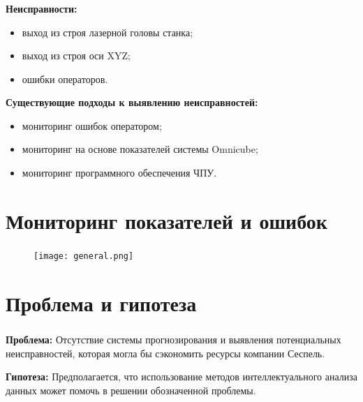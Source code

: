 \begin{frame}
\frametitle{\insertsection}

\textbf{Неисправности:}
\begin{itemize}
    \item выход из строя лазерной головы станка;
    \item выход из строя оси XYZ;
    \item ошибки операторов.
\end{itemize}

\textbf{Существующие подходы к выявлению неисправностей:}
\begin{itemize}
    \item мониторинг ошибок оператором;
    \item мониторинг на основе показателей системы Omnicube;
    \item мониторинг программного обеспечения ЧПУ.
\end{itemize}


\end{frame}


\section{Мониторинг показателей и ошибок}

\begin{frame}
\frametitle{\insertsection}

\begin{figure}
    \center
    \texttt{[image: general.png]}
\end{figure}


\end{frame}


\section{Проблема и гипотеза}

\begin{frame}
    \frametitle{\insertsection}

\textbf{Проблема:}
Отсутствие системы прогнозирования и выявления потенциальных неисправностей,
которая могла бы сэкономить ресурсы компании Сеспель.

\vspace{\baselineskip}

\textbf{Гипотеза:}
Предполагается, что использование методов интеллектуального анализа данных
может помочь в решении обозначенной проблемы.


\end{frame}

